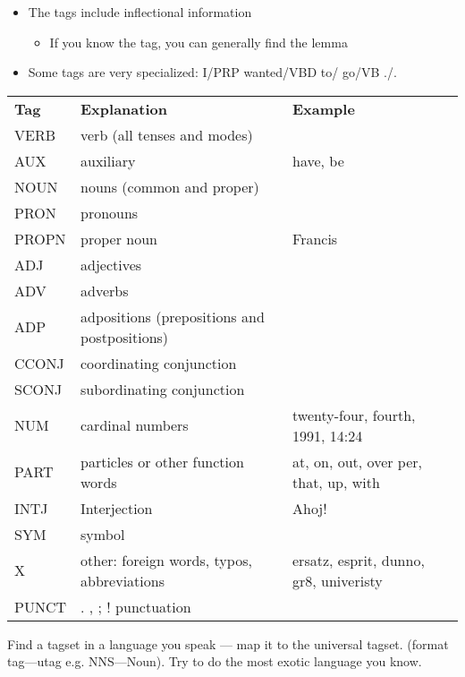 \documentclass[a4paper,landscape,headrule,footrule,xetex]{foils}
\begin{document}
\begin{itemize}
\item The tags include inflectional information
  \begin{itemize}
  \item If you know the tag, you can generally find the lemma
  \end{itemize}
\item Some tags are very specialized: I/PRP wanted/VBD to/ go/VB ./.
\end{itemize}

{\small
  \noindent
  \begin{tabular}{lll}
    \textbf{Tag}  &\textbf{Explanation} & \textbf{Example}\\
     VERB & verb (all tenses and modes) &   \\
     AUX  & auxiliary & have, be \\
     NOUN & nouns (common and proper) &   \\
     PRON & pronouns &   \\
     PROPN & proper noun & Francis \\
    ADJ &adjectives &   \\
    ADV & adverbs &   \\
    ADP & adpositions (prepositions and postpositions) &   \\
      CCONJ & coordinating conjunction \\
      SCONJ & subordinating conjunction \\
NUM &cardinal numbers & twenty-four, fourth, 1991, 14:24  \\
PART &particles or other function words & at, on, out, over per, that, up, with  \\
INTJ & Interjection & Ahoj! \\
SYM & symbol \\
X & other: foreign words, typos, abbreviations &  ersatz, esprit, dunno, gr8, univeristy \\
PUNCT & . , ; ! punctuation 
             
\end{tabular}
}






Find a tagset in a language you speak --- map it to the universal
tagset.  (format tag---utag e.g. NNS---Noun).  Try to do the most
exotic language you know.
\end{document}
